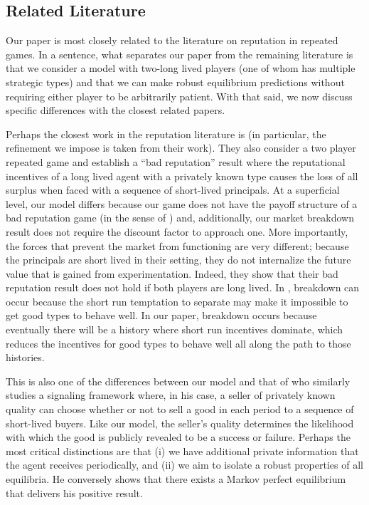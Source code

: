 \documentclass[11pt,reqno]{amsart}
\begin{document}
\subsection{Related Literature}\label{sec:rel_lit}

Our paper is most closely related to the literature on reputation in repeated games. In a sentence, what separates our paper from the remaining literature is that we consider a model with two-long lived players (one of whom has multiple strategic types) and that we can make robust equilibrium predictions without requiring either player to be arbitrarily patient. With that said, we now discuss specific differences with the closest related papers.

Perhaps the closest work in the reputation literature is \cite{ely2003} (in particular, the refinement we impose is taken from their work). They also consider a two player repeated game and establish a ``bad reputation'' result where the reputational incentives of a long lived agent with a privately known type causes the loss of all surplus when faced with a sequence of short-lived principals. At a superficial level, our model differs because our game does not have the payoff structure of a bad reputation game (in the sense of \cite{ely2008}) and, additionally, our market breakdown result does not require the discount factor to approach one. More importantly, the forces that prevent the market from functioning are very different; because the principals are short lived in their setting, they do not internalize the future value that is gained from experimentation. Indeed, they show that their bad reputation result does not hold if both players are long lived. In \cite{ely2008}, breakdown can occur because the short run temptation to separate may make it impossible to get good types to behave well. In our paper, breakdown occurs because eventually there will be a history where short run incentives dominate, which reduces the incentives for good types to behave well all along the path to those histories.

This is also one of the differences between our model and that of \citet{bar-isaac2003} who similarly studies a signaling framework where, in his case, a seller of privately known quality can choose whether or not to sell a good in each period to a sequence of short-lived buyers. Like our model, the seller's quality determines the likelihood with which the good is publicly revealed to be a success or failure. Perhaps the most critical distinctions are that (i) we have additional private information that the agent receives periodically, and (ii) we aim to isolate a robust properties of all equilibria. He conversely shows that there exists a Markov perfect equilibrium that delivers his positive result.
\end{document}
